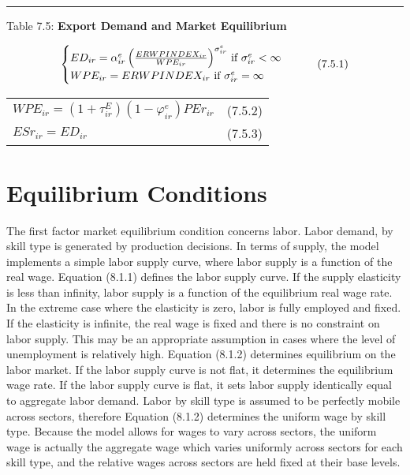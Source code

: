 \documentclass{article}
\begin{document}
\noindent\rule{\linewidth}{0.4pt}
\begin{center}
\begin{large}
{\centering Table 7.5: \textbf{Export Demand and Market Equilibrium} \par}


\begin{equation}
    \begin{cases}
      $$ED_{ir} = \alpha^e_{ir} \left(\frac{ER WPINDEX_{ir}}{WPE_{ir}} \right)^{\sigma^e_{ir}}$$ \text{ if } $$\sigma^e_{ir} < \infty$$\\
      $$WPE_{ir} = ER WPINDEX_{ir}$$ \text{ if } $$\sigma^e_{ir} = \infty$$\\
    \end{cases}       
    \tag{7.5.1}
\end{equation}

\begin{tabular}{>{\raggedright}p{} l}

$WPE_{ir} = \left(1 + \tau^E_{ir} \right) \left(1 - \varphi^e_{ir} \right) PEr_{ir}$ & (7.5.2)\\[15pt]

$ESr_{ir} = ED_{ir}$ & (7.5.3)\\[15pt]

\hline

\end{tabular}
\end{large}
\end{center}

\section{Equilibrium Conditions}

The first factor market equilibrium condition concerns labor. Labor demand, by skill type is generated by production decisions. In terms of supply, the model implements a simple labor supply curve, where labor supply is a function of the real wage. Equation (8.1.1) defines the labor supply curve. If the supply elasticity is less than infinity, labor supply is a function of the equilibrium real wage rate. In the extreme case where the elasticity is zero, labor is fully employed and fixed. If the elasticity is infinite, the real wage is fixed and there is no constraint on labor supply. This may be an appropriate assumption in cases where the level of unemployment is relatively high. Equation (8.1.2) determines equilibrium on the labor market. If the labor supply curve is not flat, it determines the equilibrium wage rate. If the labor supply curve is flat, it sets labor supply identically equal to aggregate labor demand. Labor by skill type is assumed to be perfectly mobile across sectors, therefore Equation (8.1.2) determines the uniform wage by skill type. Because the model allows for wages to vary across sectors, the uniform wage is actually the aggregate wage which varies uniformly across sectors for each skill type, and the relative wages across sectors are held fixed at their base levels.
\end{document}
